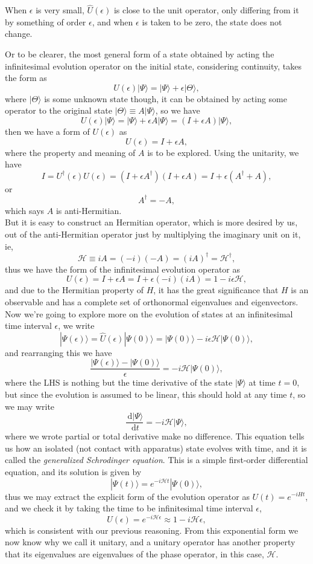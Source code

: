 \documentclass{article}
\newcommand{\be}{\begin{equation}}
\newcommand{\ee}{\end{equation}}
\newcommand{\dif}{\,\mathrm{d}}
\renewcommand{\1}{\left}
\renewcommand{\2}{\right}
\newcommand{\ma}{\mathcal}
\newcommand{\ra}{\rangle}
\newcommand{\ep}{\epsilon}
\begin{document}
When $\epsilon$ is very small, $\hat U(\epsilon)$ is close to the unit operator, only differing from it by something of order $\epsilon$, and when $\ep$ is taken to be zero, the state does not change. 

Or to be clearer, the most general form of a state obtained by acting the infinitesimal evolution operator on the initial state, considering continuity, takes the form as
\be
U(\ep)|\Psi\ra=|\Psi\ra+\ep|\Theta\ra,
\ee
where $|\Theta\ra$ is some unknown state though, it can be obtained by acting some operator to the original state $|\Theta\ra\equiv A|\Psi\ra$, so we have
\be
U(\ep)|\Psi\ra=|\Psi\ra+\ep A|\Psi\ra =(I+\ep A)|\Psi\ra,
\ee
then we have a form of $U(\ep)$ as
\be
U(\epsilon)=I+\ep A,
\ee
where the property and meaning of $A$ is to be explored. Using the unitarity, we have
\be
I=U^\dagger(\epsilon)U(\epsilon)=(I+\ep A^\dagger)(I+\ep A)=I+\epsilon (A^\dagger+A),
\ee
or
\be
A^\dagger=-A,
\ee
which says $A$ is anti-Hermitian.\\
But it is easy to construct an Hermitian operator, which is more desired by us, out of the anti-Hermitian operator just by multiplying the imaginary unit on it, ie, 
\be\ma H\equiv iA =(-i)(-A)= (iA)^\dagger = \ma H^\dagger,\ee
thus we have the form of the infinitesimal evolution operator as
\be
U(\epsilon)=I+\ep A=I+\epsilon (-i)(iA)=1-i\ep\ma H,
\ee
and due to the Hermitian property of $H$, it has the great significance that $H$ is an observable and has a complete set of orthonormal eigenvalues and eigenvectors.\\

Now we're going to explore more on the evolution of states at an infinitesimal time interval $\epsilon$, we write
\be
|\Psi(\ep)\ra=\hat U(\ep) |\Psi(0)\ra = |\Psi(0)\ra-i\ep\ma H|\Psi(0)\ra,
\ee
and rearranging this we have
\be
\frac{|\Psi(\ep)\ra-|\Psi(0)\ra}{\ep}=-i\ma H|\Psi(0)\ra,
\ee
where the LHS is nothing but the time derivative of the state $|\Psi\ra$ at time $t=0$, but since the evolution is assumed to be linear, this should hold at any time $t$, so we may write
\be
\frac{\dif |\Psi\ra}{\dif t}=-i\ma H|\Psi\ra,
\ee
where we wrote partial or total derivative make no difference. This equation tells us how an isolated (not contact with apparatus) state evolves with time, and it is called the \textit{generalized Schrodinger equation}. This is a simple first-order differential equation, and its solution is given by
\be
|\Psi(t)\ra=e^{-i\ma Ht}|\Psi(0)\ra,
\ee
thus we may extract the explicit form of the evolution operator as $U(t)=e^{-iHt}$, and we check it by taking the time to be infinitesimal time interval $\ep$,
\be
U(\ep)=e^{-i\ma H\ep}\approx 1-i\ma H\ep,
\ee
which is consistent with our previous reasoning. From this exponential form we now know why we call it unitary, and a unitary operator has another property that its eigenvalues are eigenvalues of the phase operator, in this case, $\ma H$.
\end{document}
